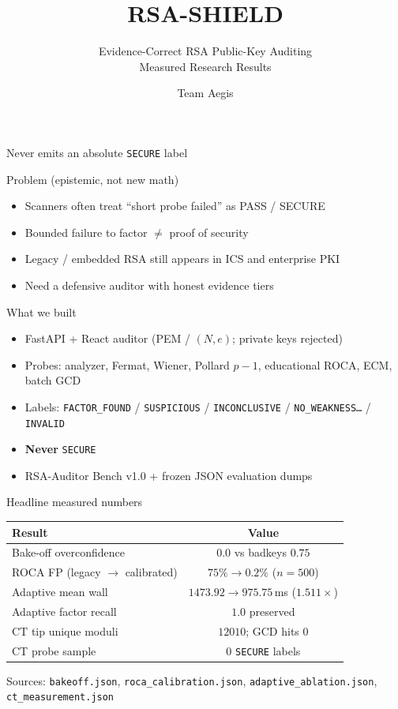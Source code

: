 \documentclass[aspectratio=169,11pt]{beamer}
\title{RSA-SHIELD}
\subtitle{Evidence-Correct RSA Public-Key Auditing\\[0.3em]\large Measured Research Results}
\author{Team Aegis}
\institute{Bennett University\\Mentor: Dr.\ Sachin Choudhary}
\date{}
\begin{document}
\begin{frame}
  \titlepage
  \vspace{-1em}
  \begin{center}\footnotesize Never emits an absolute \texttt{SECURE} label\end{center}
\end{frame}

\begin{frame}{Problem (epistemic, not new math)}
  \begin{itemize}
    \item Scanners often treat ``short probe failed'' as PASS / SECURE
    \item Bounded failure to factor $\neq$ proof of security
    \item Legacy / embedded RSA still appears in ICS and enterprise PKI
    \item Need a defensive auditor with honest evidence tiers
  \end{itemize}
\end{frame}

\begin{frame}{What we built}
  \begin{itemize}
    \item FastAPI + React auditor (PEM / $(N,e)$; private keys rejected)
    \item Probes: analyzer, Fermat, Wiener, Pollard $p{-}1$, educational ROCA, ECM, batch GCD
    \item Labels: \texttt{FACTOR\_FOUND} / \texttt{SUSPICIOUS} / \texttt{INCONCLUSIVE} / \texttt{NO\_WEAKNESS\ldots} / \texttt{INVALID}
    \item \textbf{Never} \texttt{SECURE}
    \item RSA-Auditor Bench v1.0 + frozen JSON evaluation dumps
  \end{itemize}
\end{frame}

\begin{frame}{Headline measured numbers}
  \centering
  \renewcommand{\arraystretch}{1.25}
  \begin{tabular}{lc}
    \toprule
    \textbf{Result} & \textbf{Value} \\
    \midrule
    Bake-off overconfidence & $0.0$ vs badkeys $0.75$ \\
    ROCA FP (legacy $\to$ calibrated) & $75\% \to 0.2\%$ ($n{=}500$) \\
    Adaptive mean wall & $1473.92 \to 975.75$\,ms ($1.511\times$) \\
    Adaptive factor recall & $1.0$ preserved \\
    CT tip unique moduli & $12010$; GCD hits $0$ \\
    CT probe sample & $0$ \texttt{SECURE} labels \\
    \bottomrule
  \end{tabular}

  \vspace{0.8em}
  \footnotesize Sources: \texttt{bakeoff.json}, \texttt{roca\_calibration.json}, \texttt{adaptive\_ablation.json}, \texttt{ct\_measurement.json}
\end{frame}
\end{document}
